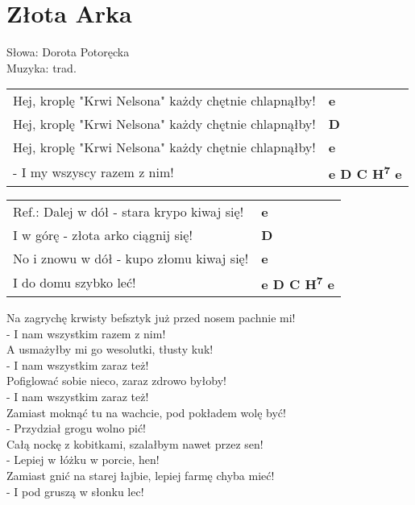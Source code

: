 \section{Złota Arka}

Słowa: Dorota Potoręcka\\
Muzyka:  trad.

\vspace{2em}
\begin{tabular}{@{}p{9cm}@{}l@{}}
Hej, kroplę "Krwi Nelsona" każdy chętnie chlapnąłby! & \bfseries  e \\
Hej, kroplę "Krwi Nelsona" każdy chętnie chlapnąłby! & \bfseries  D \\
Hej, kroplę "Krwi Nelsona" każdy chętnie chlapnąłby! & \bfseries  e \\
- I my wszyscy razem z nim! & \bfseries  e D C H\textsuperscript{7} e \\
\end{tabular}

\vspace{1em}
\begin{tabular}{@{}p{9cm}@{}l@{}}
Ref.: Dalej w dół - stara krypo kiwaj się! & \bfseries  e \\
I w górę - złota arko ciągnij się! & \bfseries  D \\
No i znowu w dół - kupo złomu kiwaj się! & \bfseries  e \\
I do domu szybko leć!  & \bfseries  e D C H\textsuperscript{7} e \\
\end{tabular}

\vspace{1em}
Na zagrychę krwisty befsztyk już przed nosem pachnie mi! \\
- I nam wszystkim razem z nim! \\

A usmażyłby mi go wesolutki, tłusty kuk! \\
- I nam wszystkim zaraz też! \\

Pofiglować sobie nieco, zaraz zdrowo byłoby! \\
- I nam wszystkim zaraz też! \\

Zamiast moknąć tu na wachcie, pod pokładem wolę być! \\
- Przydział grogu wolno pić! \\

Całą nockę z kobitkami, szalałbym nawet przez sen! \\
- Lepiej w łóżku w porcie, hen! \\

Zamiast gnić na starej łajbie, lepiej farmę chyba mieć! \\
- I pod gruszą w słonku lec!